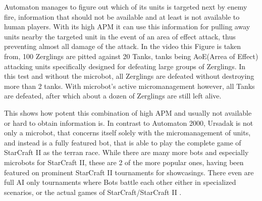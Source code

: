 Automaton manages to figure out which of its units is targeted next by enemy fire, information that should not be available and at least is not available to human players. With its high APM it can use this information for pulling away units nearby the targeted unit in the event of an area of effect attack, thus preventing almost all damage of the attack. In the video this Figure is taken from, 100 Zerglings are pitted against 20 Tanks, tanks being AoE(Arrea of Effect) attacking units specifically designed for defeating large groups of Zerglings. In this test and without the microbot, all Zerglings are defeated without destroying more than 2 tanks. With microbot's active micromanagement however, all Tanks are defeated, after which about a dozen of Zerglings are still left alive. 

This shows how potent this combination of high APM and usually not available or hard to obtain information is. In contrast to Automaton 2000, Ursadak is not only a microbot, that concerns itself solely with the micromanagement of units, and instead is a fully featured bot, that is able to play the complete game of StarCraft II as the terran race. While there are many more bots and especially microbots for StarCraft II, these are 2 of the more popular ones, having been featured on prominent StarCraft II tournaments for showcasings. There even are full AI only tournaments where Bots battle each other either in specialized scenarios, or the actual games of StarCraft/StarCraft II \citep{scai:comps}.




